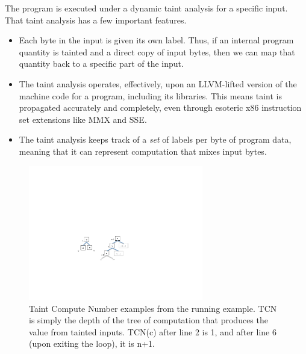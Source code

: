 The program is executed under a dynamic taint analysis for a specific input.
That taint analysis has a few important features.
\begin{itemize}
\item Each byte in the input is given its own label.
Thus, if an internal program quantity is tainted and a direct copy of input bytes, then we can map that quantity back to a specific part of the input.  
\item The taint analysis operates, effectively, upon an LLVM-lifted version of the machine code for a program, including its libraries.
This means taint is propagated accurately and completely, even through esoteric x86 instruction set extensions like MMX and SSE.
\item The taint analysis keeps track of a \emph{set} of labels per byte of program data, meaning that it can represent computation that mixes input bytes.
\end{itemize}


\begin{figure}
\centering
\includegraphics[width=3in]{tcn.pdf}
\caption{Taint Compute Number examples from the running example.  
TCN is simply the depth of the tree of computation that produces the value from tainted inputs.
TCN(c) after line 2 is 1, and after line 6 (upon exiting the loop), it is n+1.}
\label{fig:taint-compute-number}
\end{figure}

